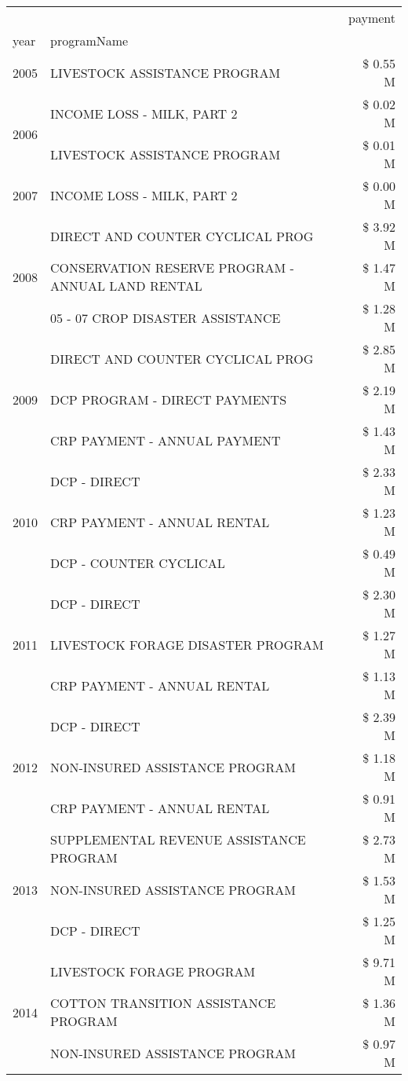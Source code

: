 \begin{tabular}{llr}
\toprule
 &  & payment \\
year & programName &  \\
\midrule
2005 & LIVESTOCK ASSISTANCE PROGRAM & \$ 0.55 M \\
\cline{1-3}
\multirow[t]{2}{*}{2006} & INCOME LOSS - MILK, PART 2 & \$ 0.02 M \\
 & LIVESTOCK ASSISTANCE PROGRAM & \$ 0.01 M \\
\cline{1-3}
2007 & INCOME LOSS - MILK, PART 2 & \$ 0.00 M \\
\cline{1-3}
\multirow[t]{3}{*}{2008} & DIRECT AND COUNTER CYCLICAL PROG & \$ 3.92 M \\
 & CONSERVATION RESERVE PROGRAM - ANNUAL LAND RENTAL & \$ 1.47 M \\
 & 05 - 07 CROP DISASTER ASSISTANCE & \$ 1.28 M \\
\cline{1-3}
\multirow[t]{3}{*}{2009} & DIRECT AND COUNTER CYCLICAL PROG & \$ 2.85 M \\
 & DCP PROGRAM - DIRECT PAYMENTS & \$ 2.19 M \\
 & CRP PAYMENT - ANNUAL PAYMENT & \$ 1.43 M \\
\cline{1-3}
\multirow[t]{3}{*}{2010} & DCP - DIRECT & \$ 2.33 M \\
 & CRP PAYMENT - ANNUAL RENTAL & \$ 1.23 M \\
 & DCP - COUNTER CYCLICAL & \$ 0.49 M \\
\cline{1-3}
\multirow[t]{3}{*}{2011} & DCP - DIRECT & \$ 2.30 M \\
 & LIVESTOCK FORAGE DISASTER PROGRAM & \$ 1.27 M \\
 & CRP PAYMENT - ANNUAL RENTAL & \$ 1.13 M \\
\cline{1-3}
\multirow[t]{3}{*}{2012} & DCP - DIRECT & \$ 2.39 M \\
 & NON-INSURED ASSISTANCE PROGRAM & \$ 1.18 M \\
 & CRP PAYMENT - ANNUAL RENTAL & \$ 0.91 M \\
\cline{1-3}
\multirow[t]{3}{*}{2013} & SUPPLEMENTAL REVENUE ASSISTANCE PROGRAM & \$ 2.73 M \\
 & NON-INSURED ASSISTANCE PROGRAM & \$ 1.53 M \\
 & DCP - DIRECT & \$ 1.25 M \\
\cline{1-3}
\multirow[t]{3}{*}{2014} & LIVESTOCK FORAGE PROGRAM & \$ 9.71 M \\
 & COTTON TRANSITION ASSISTANCE PROGRAM & \$ 1.36 M \\
 & NON-INSURED ASSISTANCE PROGRAM & \$ 0.97 M \\

\end{tabular}
